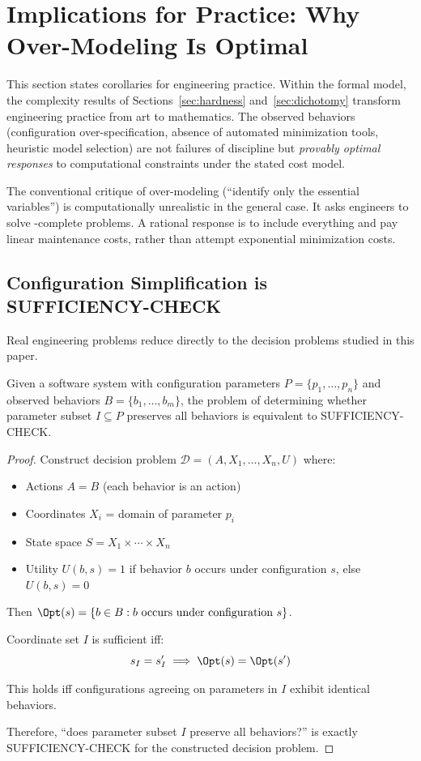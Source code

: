 \section{Implications for Practice: Why Over-Modeling Is Optimal}\label{sec:engineering-justification}

This section states corollaries for engineering practice. Within the formal model, the complexity results of Sections~\ref{sec:hardness} and~\ref{sec:dichotomy} transform engineering practice from art to mathematics. The observed behaviors (configuration over-specification, absence of automated minimization tools, heuristic model selection) are not failures of discipline but \emph{provably optimal responses} to computational constraints under the stated cost model.

The conventional critique of over-modeling (``identify only the essential variables'') is computationally unrealistic in the general case. It asks engineers to solve \coNP-complete problems. A rational response is to include everything and pay linear maintenance costs, rather than attempt exponential minimization costs.

\subsection{Configuration Simplification is SUFFICIENCY-CHECK}

Real engineering problems reduce directly to the decision problems studied in this paper.

\begin{theorem}
\label{thm:config-reduction}
Given a software system with configuration parameters $P = \{p_1, \ldots, p_n\}$ and observed behaviors $B = \{b_1, \ldots, b_m\}$, the problem of determining whether parameter subset $I \subseteq P$ preserves all behaviors is equivalent to SUFFICIENCY-CHECK.
\end{theorem}

\begin{proof}
Construct decision problem $\mathcal{D} = (A, X_1, \ldots, X_n, U)$ where:
\begin{itemize}
\item Actions $A = B$ (each behavior is an action)
\item Coordinates $X_i$ = domain of parameter $p_i$
\item State space $S = X_1 \times \cdots \times X_n$
\item Utility $U(b, s) = 1$ if behavior $b$ occurs under configuration $s$, else $U(b, s) = 0$
\end{itemize}

Then $\Opt(s) = \{b \in B : b \text{ occurs under configuration } s\}$.

Coordinate set $I$ is sufficient iff:
\[
s_I = s'_I \implies \Opt(s) = \Opt(s')
\]

This holds iff configurations agreeing on parameters in $I$ exhibit identical behaviors.

Therefore, ``does parameter subset $I$ preserve all behaviors?'' is exactly SUFFICIENCY-CHECK for the constructed decision problem.
\end{proof}

